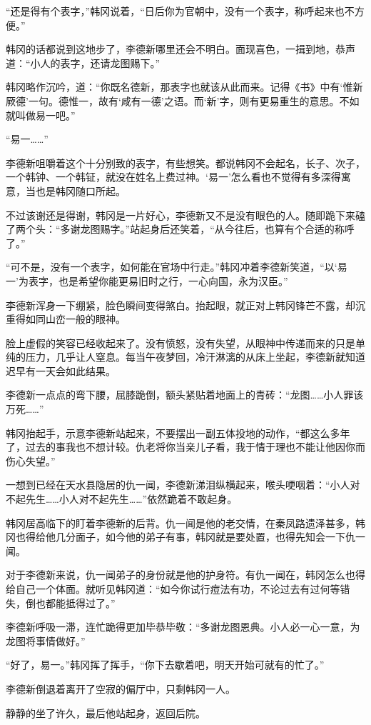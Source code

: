 “还是得有个表字，”韩冈说着，“日后你为官朝中，没有一个表字，称呼起来也不方便。”

韩冈的话都说到这地步了，李德新哪里还会不明白。面现喜色，一揖到地，恭声道：“小人的表字，还请龙图赐下。”

韩冈略作沉吟，道：“你既名德新，那表字也就该从此而来。记得《书》中有‘惟新厥德’一句。德惟一，故有‘咸有一德’之语。而‘新’字，则有更易重生的意思。不如就叫做易一吧。”

“易一……”

李德新咀嚼着这个十分别致的表字，有些想笑。都说韩冈不会起名，长子、次子，一个韩钟、一个韩钲，就没在姓名上费过神。‘易一’怎么看也不觉得有多深得寓意，当也是韩冈随口所起。

不过该谢还是得谢，韩冈是一片好心，李德新又不是没有眼色的人。随即跪下来磕了两个头：“多谢龙图赐字。”站起身后还笑着，“从今往后，也算有个合适的称呼了。”

“可不是，没有一个表字，如何能在官场中行走。”韩冈冲着李德新笑道，“以‘易一’为表字，也是希望你能更易旧时之行，一心向国，永为汉臣。”

李德新浑身一下绷紧，脸色瞬间变得煞白。抬起眼，就正对上韩冈锋芒不露，却沉重得如同山峦一般的眼神。

脸上虚假的笑容已经收起来了。没有愤怒，没有失望，从眼神中传递而来的只是单纯的压力，几乎让人窒息。每当午夜梦回，冷汗淋漓的从床上坐起，李德新就知道迟早有一天会如此结果。

李德新一点点的弯下腰，屈膝跪倒，额头紧贴着地面上的青砖：“龙图……小人罪该万死……”

韩冈抬起手，示意李德新站起来，不要摆出一副五体投地的动作，“都这么多年了，过去的事我也不想计较。仇老将你当亲儿子看，我于情于理也不能让他因你而伤心失望。”

一想到已经在天水县隐居的仇一闻，李德新涕泪纵横起来，喉头哽咽着：“小人对不起先生……小人对不起先生……”依然跪着不敢起身。

韩冈居高临下的盯着李德新的后背。仇一闻是他的老交情，在秦凤路遗泽甚多，韩冈也得给他几分面子，如今他的弟子有事，韩冈就是要处置，也得先知会一下仇一闻。

对于李德新来说，仇一闻弟子的身份就是他的护身符。有仇一闻在，韩冈怎么也得给自己一个体面。就听见韩冈道：“如今你试行痘法有功，不论过去有过何等错失，倒也都能抵得过了。”

李德新呼吸一滞，连忙跪得更加毕恭毕敬：“多谢龙图恩典。小人必一心一意，为龙图将事情做好。”

“好了，易一。”韩冈挥了挥手，“你下去歇着吧，明天开始可就有的忙了。”

李德新倒退着离开了空寂的偏厅中，只剩韩冈一人。

静静的坐了许久，最后他站起身，返回后院。

